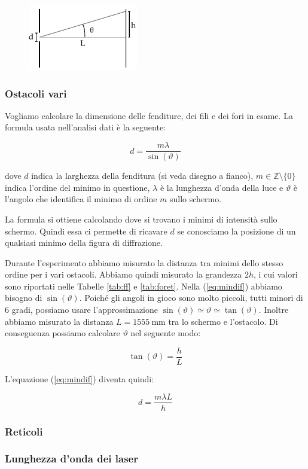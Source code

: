 \begin{figure}
    \vspace{-5mm}
    \begin{center}
        \includegraphics[width=48mm]{fen.pdf}
    \end{center}
    \vspace{-2mm}
\end{figure}

\subsubsection{Ostacoli vari}

Vogliamo calcolare la dimensione delle fenditure, dei fili e dei fori in esame.
La formula usata nell'analisi dati è la seguente:

\begin{equation}
    d = \frac{m\lambda}{\sin(\vartheta)}
    \label{eq:mindif}
\end{equation}

dove $d$ indica la larghezza della fenditura (si veda disegno a fianco),
$m \in \mathbb{Z} \setminus \{0\}$ indica l'ordine del minimo in questione,
$\lambda$ è la lunghezza d'onda della luce e $\vartheta$ è l'angolo che identifica
il minimo di ordine $m$ sullo schermo.

La formula si ottiene calcolando dove si trovano i minimi di intensità sullo schermo.
Quindi essa ci permette di ricavare $d$ se conosciamo la posizione di un qualsiasi minimo
della figura di diffrazione.

Durante l'esperimento abbiamo misurato la distanza tra minimi dello stesso ordine per i vari ostacoli.
Abbiamo quindi misurato la grandezza $2h$, i cui valori sono riportati nelle Tabelle \ref{tab:ff} e \ref{tab:foret}.
Nella (\ref{eq:mindif}) abbiamo bisogno di $\sin(\vartheta)$. Poiché gli angoli in gioco sono molto piccoli, tutti minori
di 6 gradi, possiamo usare l'approssimazione $\sin(\vartheta) \simeq \vartheta \simeq \tan(\vartheta)$. Inoltre abbiamo
misurato la distanza $L = \SI{1555}{\milli\metre}$ tra lo schermo e l'ostacolo.
Di conseguenza possiamo calcolare $\vartheta$ nel seguente modo:

\begin{equation}
    \tan(\vartheta) = \frac{h}{L}
\end{equation}

L'equazione (\ref{eq:mindif}) diventa quindi:

\begin{equation}
    d = \frac{m\lambda L}{h}
\end{equation}

\subsubsection{Reticoli}

\subsubsection{Lunghezza d'onda dei laser}
